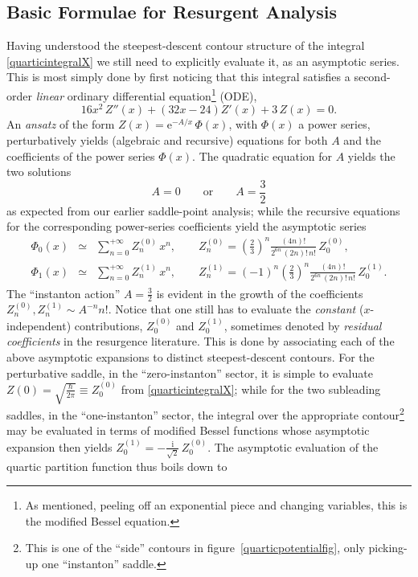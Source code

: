 \documentclass[11pt,a4paper]{article}
\newcommand{\be}{\begin{equation}}
\newcommand{\ee}{\end{equation}}
\newcommand{\bea}{\begin{eqnarray}}
\newcommand{\eea}{\end{eqnarray}}
\newcommand{\rme}{{\mathrm{e}}}
\newcommand{\rmi}{{\mathrm{i}}}
\begin{document}
\subsection{Basic Formulae for Resurgent Analysis}\label{subsec:basicresurgence}

Having understood the steepest-descent contour structure of the integral \eqref{quarticintegralX} we still need to explicitly evaluate it, as an asymptotic series. This is most simply done by first noticing that this integral satisfies a second-order \textit{linear} ordinary differential equation\footnote{As mentioned, peeling off an exponential piece and changing variables, this is the modified Bessel equation.} (ODE),
%
\be
\label{quarticODE}
16 x^2\, Z'' (x) + \left( 32 x - 24 \right) Z' (x) + 3\, Z (x) = 0.
\ee
%
\noindent
An \textit{ansatz} of the form $Z (x) = \rme^{-A/x}\, \Phi (x)$, with $\Phi (x)$ a power series, perturbatively yields (algebraic and recursive) equations for both $A$ and the coefficients of the power series $\Phi (x)$. The quadratic equation for $A$ yields the two solutions
%
\be
\label{instactions}
A = 0 \qquad \text{or} \qquad A = \frac{3}{2}
\ee
%
\noindent
as expected from our earlier saddle-point analysis; while the recursive equations for the corresponding power-series coefficients yield the asymptotic series
%
\bea
\label{coeff-quartic}
\Phi_{0} (x) &\simeq& \sum_{n=0}^{+\infty} Z^{(0)}_n\, x^n, \qquad Z^{(0)}_n = \left( \frac{2}{3} \right)^n \frac{(4n)!}{2^{6n}\, (2n)!\, n!}\, Z^{(0)}_0, \\
\label{coeff-quartic-inst}
\Phi_{1} (x) &\simeq& \sum_{n=0}^{+\infty} Z^{(1)}_n\, x^n, \qquad Z^{(1)}_n = (-1)^n \left( \frac{2}{3} \right)^n \frac{(4n)!}{2^{6n}\, (2n)!\, n!}\, Z^{(1)}_0.
\eea
%
\noindent
The ``instanton action'' $A=\frac{3}{2}$ is evident in the growth of the coefficients $Z^{(0)}_n, Z^{(1)}_n \sim A^{-n} n!$. Notice that one still has to evaluate the \textit{constant} ($x$-independent) contributions, $Z^{(0)}_0$ and $Z^{(1)}_0$, sometimes denoted by \textit{residual coefficients} in the resurgence literature. This is done by associating each of the above asymptotic expansions to distinct steepest-descent contours. For the perturbative saddle, in the ``zero-instanton'' sector, it is simple to evaluate $Z (0) = \sqrt{\frac{\hbar}{2\pi}} \equiv Z^{(0)}_0$ from \eqref{quarticintegralX}; while for the two subleading saddles, in the ``one-instanton'' sector, the integral over the appropriate contour\footnote{This is one of the ``side'' contours in figure~\ref{quarticpotentialfig}, only picking-up one ``instanton'' saddle.} may be evaluated in terms of modified Bessel functions whose asymptotic expansion then yields $Z^{(1)}_0 = -\frac{\rmi}{\sqrt{2}}\, Z^{(0)}_0$. The asymptotic evaluation of the quartic partition function thus boils down to
\end{document}
